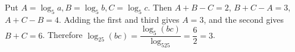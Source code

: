 Put $A=\log_5a,B=\log_5b,C=\log_5c$. Then $A+B-C=2$, $B+C-A=3$, $A+C-B=4$. Adding the first and third gives $A=3$, and the second gives $B+C=6$. Therefore $\log_{25}(bc)=\dfrac{\log_5(bc)}{\log_525}=\dfrac{6}{2}=\boxed3$.
